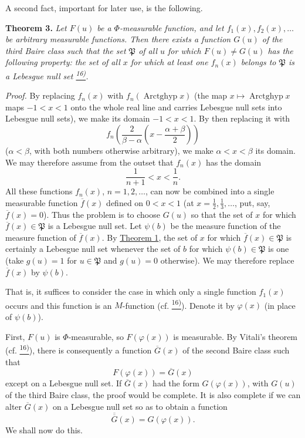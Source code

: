 \documentclass[12pt,b5paper,twoside]{article}
\newcommand{\noteref}[1]{%
  \hyperlink{note:#1}{\textsuperscript{#1)}}}
\begin{document}
A second fact, important for later use, is the following.

\label{thm:3}
\noindent\textbf{Theorem 3.} \emph{Let $F(u)$ be a $\Phi$-measurable function, and let $f_1(x),f_2(x),\ldots$ be arbitrary measurable functions. Then there exists a function $G(u)$ of the third Baire class such that the set $\mathfrak P$ of all $u$ for which $F(u)\neq G(u)$ has the following property: the set of all $x$ for which at least one $f_n(x)$ belongs to $\mathfrak P$ is a Lebesgue null set\noteref{16}.}

\textit{Proof.} By replacing $f_n(x)$ with $f_n(\operatorname{Arctghyp}x)$ (the map $x\mapsto\operatorname{Arctghyp}x$ maps $-1<x<1$ onto the whole real line and carries Lebesgue null sets into Lebesgue null sets), we make its domain $-1<x<1$. By then replacing it with
\[
 f_n\!\left(\frac{2}{\beta-\alpha}
       \left(x-\frac{\alpha+\beta}{2}\right)\right)
\]
($\alpha<\beta$, with both numbers otherwise arbitrary), we make $\alpha<x<\beta$ its domain. We may therefore assume from the outset that $f_n(x)$ has the domain
\[
 \frac{1}{n+1}<x<\frac{1}{n}.
\]
All these functions $f_n(x)$, $n=1,2,\ldots$, can now be combined into a single
measurable function $\overline f(x)$ defined on $0<x<1$ (at
$x=\tfrac12,\tfrac13,\ldots$, put, say, $\overline f(x)=0$). Thus the problem is to
choose $G(u)$ so that the set of $x$ for which $\overline f(x)\in\mathfrak P$ is a
Lebesgue null set. Let $\psi(b)$ be the measure function of the measure function of
$\overline f(x)$. By \hyperref[thm:1]{Theorem 1}, the set of $x$ for which
$\overline f(x)\in\mathfrak P$ is certainly a Lebesgue null set whenever the set of
$b$ for which $\psi(b)\in\mathfrak P$ is one (take $g(u)=1$ for
$u\in\mathfrak P$ and $g(u)=0$ otherwise). We may therefore replace
$\overline f(x)$ by $\psi(b)$.

That is, it suffices to consider the case in which only a single function $f_1(x)$ occurs and this function is an $M$-function (cf. \noteref{16}). Denote it by $\varphi(x)$ (in place of $\psi(b)$).

First, $F(u)$ is $\Phi$-measurable, so $F(\varphi(x))$ is measurable. By Vitali's theorem (cf. \noteref{16}), there is consequently a function $\overline G(x)$ of the second Baire class such that
\[
 F(\varphi(x))=\overline G(x)
\]
except on a Lebesgue null set. If $\overline G(x)$ had the form $G(\varphi(x))$, with $G(u)$ of the third Baire class, the proof would be complete. It is also complete if we can alter $\overline G(x)$ on a Lebesgue null set so as to obtain a function
\[
 \overline{\overline G}(x)=G(\varphi(x)).
\]
We shall now do this.
\end{document}
